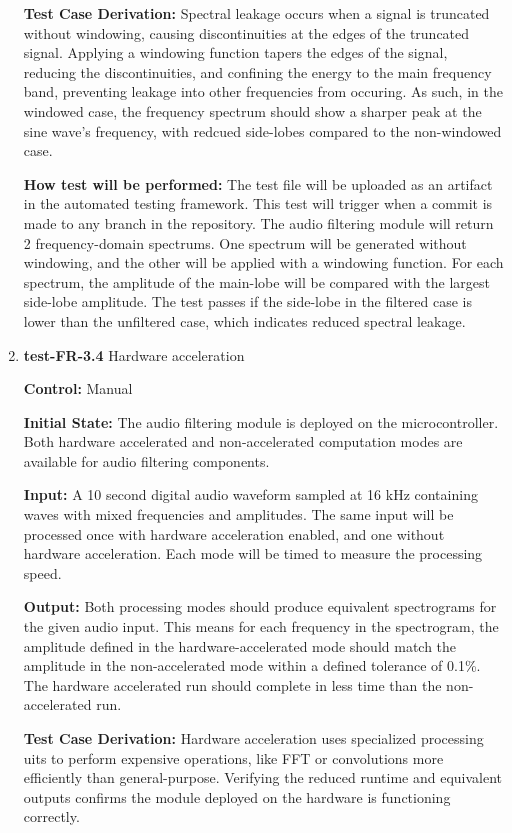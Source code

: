 \documentclass[12pt, titlepage]{article}
\begin{document}
\begin{enumerate}
\textbf{Test Case Derivation:} 
Spectral leakage occurs when a signal is truncated without windowing, causing 
discontinuities at the edges of the truncated signal. Applying a windowing 
function tapers the edges of the signal, reducing the discontinuities, and 
confining the energy to the main frequency band, preventing leakage into other 
frequencies from occuring. As such, in the windowed case, the frequency 
spectrum should show a sharper peak at the sine wave's frequency, with redcued 
side-lobes compared to the non-windowed case.

\textbf{How test will be performed:}
The test file will be uploaded as an artifact in the automated testing 
framework. This test will trigger when a commit is made to any branch in the 
repository. The audio filtering module will return 2 frequency-domain spectrums.
 One spectrum will be generated without windowing, and the other will be applied
 with a windowing function. For each spectrum, the amplitude of the main-lobe 
will be compared with the largest side-lobe amplitude. The test passes if the 
side-lobe in the filtered case is lower than the unfiltered case, which 
indicates reduced spectral leakage. 

\item{\textbf{test-FR-3.4} Hardware acceleration\\}

\textbf{Control:} Manual
					
\textbf{Initial State:} 
The audio filtering module is deployed on the microcontroller. Both hardware 
accelerated and non-accelerated computation modes are available for audio 
filtering components.
					
\textbf{Input:}
A 10 second digital audio waveform sampled at 16 kHz containing waves with 
mixed frequencies and amplitudes. The same input will be processed once with 
hardware acceleration enabled, and one without hardware acceleration. Each 
mode will be timed to measure the processing speed. 
					
\textbf{Output:}
Both processing modes should produce equivalent spectrograms for the given 
audio input. This means for each frequency in the spectrogram, the amplitude 
defined in the hardware-accelerated mode should match the amplitude in the 
non-accelerated mode within a defined tolerance of 0.1\%. The hardware 
accelerated run should complete in less time than the non-accelerated run.

\textbf{Test Case Derivation:} 
Hardware acceleration uses specialized processing uits to perform expensive 
operations, like FFT or convolutions more efficiently than general-purpose. 
Verifying the reduced runtime and equivalent outputs confirms the module 
deployed on the hardware is functioning correctly. 


\end{enumerate}
\end{document}
